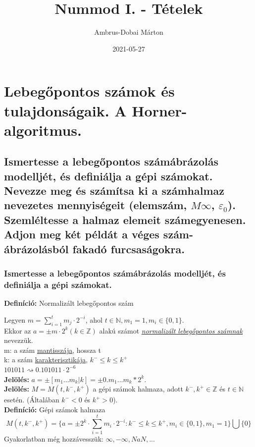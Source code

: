 \documentclass{article}
\title{Nummod I. - Tételek}
\date{2021-05-27}
\author{Ambrus-Dobai Márton}
\begin{document}
    \maketitle

    \tableofcontents

    \section{Lebegőpontos számok és tulajdonságaik. A Horner-algoritmus.}
        \subsection{
        Ismertesse a lebegőpontos számábrázolás modelljét, és definiálja a gépi számokat.
        Nevezze meg és számítsa ki a számhalmaz nevezetes mennyiségeit (elemszám, $M\infty$, $\varepsilon_0$).
        Szemléltesse a halmaz elemeit számegyenesen. Adjon meg két példát a véges szám-ábrázolásból fakadó furcsaságokra.
        }

            \subsubsection{Ismertesse a lebegőpontos számábrázolás modelljét, és definiálja a gépi számokat.}

            \textbf{Definíció:} Normalizált lebegőpontos szám

            Legyen $m = \sum^{t}_{i=1} m_j\cdot2^{-i}$, ahol $ t \in \mathbb{N}, m_1 = 1, m_i \in \{0,1\}.$ ~\\
            Ekkor az $a = \pm m \cdot 2^k (k \in \mathbb{Z})$ alakú számot \underline{\textit{normalizált lebegőpontos számnak}} nevezzük. ~\\
            m: a szám \underline{mantisszája}, hossza t ~\\
            k: a szám \underline{karakterisztikája}, $k^- \leq k \leq k^+$ ~\\
            $101011 \rightsquigarrow 0.101011\cdot2^{-6}$ ~\\
            \textbf{Jelölés:} $a = \pm[m_1...m_k|k] = \pm0.m_1...m_k * 2^k$. ~\\
            
            \textbf{Jelölés:} $M = M(t, k^-, k^+)$ a gépi számok halmaza, adott $k^-,k^+ \in \mathbb{Z}$ és $t \in \mathbb{N}$ esetén. (Általában $k^-<0$ és $k^+>0$). \\
            \textbf{Definíció:} Gépi számok halmaza ~\\
            \[M(t, k^-, k^+) = \{ a = \pm 2^k\cdot\sum^{t}_{i=1} m_i\cdot 2^{-i} : k^- \leq k \leq k^+, m_i \in \{0,1\}, m_1=1  \}\bigcup\{0\}\]
            Gyakorlatban még hozzávesszük: $\infty, -\infty, NaN, ...$
\end{document}
